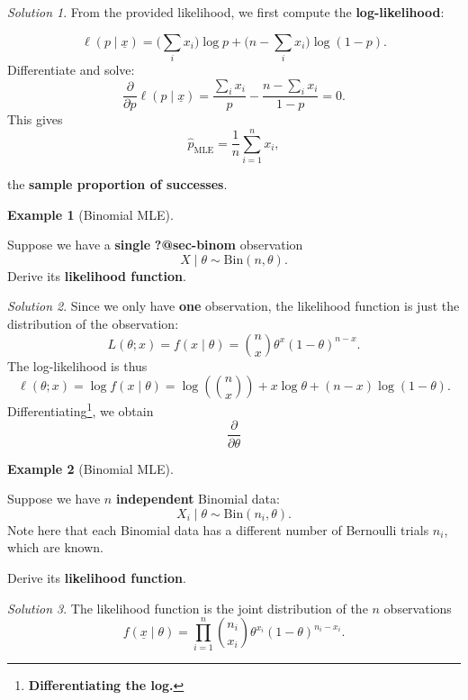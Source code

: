 \documentclass[
  letterpaper,
  DIV=11,
  numbers=noendperiod]{scrreprt}
\theoremstyle{definition}
\newtheorem{example}{Example}[chapter]
\theoremstyle{plain}
\theoremstyle{definition}
\theoremstyle{remark}
\newtheorem{refsolution}{Solution}[chapter]
\begin{document}
\begin{refsolution}
From the provided likelihood, we first compute the
\textbf{log-likelihood}:

\[
\ell(p \mid \underline{x}) 
= \Big(\sum_i x_i \Big)\log p + \Big(n-\sum_i x_i\Big)\log(1-p).
\] Differentiate and solve: \[
\frac{\partial}{\partial p}\ell(p \mid \underline{x}) 
= \frac{\sum_i x_i}{p} - \frac{n - \sum_i x_i}{1-p} = 0.
\] This gives \[
\hat{p}_{\text{MLE}} = \frac{1}{n}\sum_{i=1}^n x_i,
\]

the \textbf{sample proportion of successes}.

\label{sol-bern-mle}

\end{refsolution}

\begin{example}[Binomial
MLE]\protect\hypertarget{exm-binom-mle-single}{}\label{exm-binom-mle-single}

Suppose we have a \textbf{single} {\textbf{?@sec-binom}} observation \[
X \mid \theta \sim \textrm{Bin}(n, \theta).
\] Derive its \textbf{likelihood function}.

\end{example}

\begin{refsolution}
Since we only have \textbf{one} observation, the likelihood function is
just the distribution of the observation: \[
L(\theta ; x) = f(x \mid \theta) = \binom{n}{x} \theta^x(1-\theta)^{n-x}.
\] The log-likelihood is thus \[
\ell(\theta; x) = \log f(x \mid \theta) = \log\left(\binom{n}{x}\right) + x\log\theta + (n-x)\log(1-\theta).
\] Differentiating\footnote{\textbf{Differentiating the log.}}, we
obtain \[
\frac{\partial}{\partial \theta}
\]

\label{sol-binom-mle-single}

\end{refsolution}

\begin{example}[Binomial
MLE]\protect\hypertarget{exm-binom-mle}{}\label{exm-binom-mle}

Suppose we have \(n\) \textbf{independent} Binomial data: \[
X_i \mid \theta \sim \textrm{Bin}(n_i, \theta).
\] Note here that each Binomial data has a different number of Bernoulli
trials \(n_i\), which are known.

Derive its \textbf{likelihood function}.

\end{example}

\begin{refsolution}
The likelihood function is the joint distribution of the \(n\)
observations \[
f(\underline{x} \mid \theta) = \prod_{i=1}^n \binom{n_i}{x_i} \theta^{x_i}(1-\theta)^{n_i - x_i}.
\]

\label{sol-binom-mle}

\end{refsolution}
\end{document}
